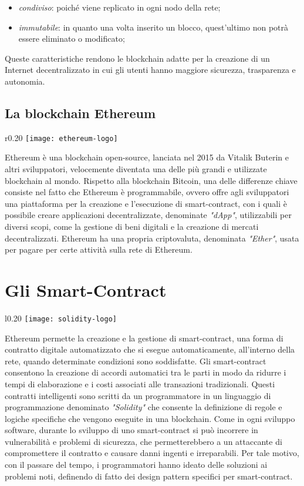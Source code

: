 \begin{itemize}
	\item \textit{condiviso}: poiché viene replicato in ogni nodo della rete;
	\item \textit{immutabile}: in quanto una volta inserito un blocco, quest'ultimo non potrà essere eliminato o modificato;
\end{itemize}
Queste caratteristiche rendono le blockchain adatte per la creazione di un Internet decentralizzato in cui gli utenti hanno maggiore sicurezza, trasparenza e autonomia.

\subsection{La blockchain Ethereum}

\begin{wrapfigure}{r}{0.20\textwidth}
	\centering
	\texttt{[image: ethereum-logo]}
\end{wrapfigure}

Ethereum\cite{ethereum} è una blockchain open-source, lanciata nel 2015 da Vitalik Buterin e altri sviluppatori, velocemente diventata una delle più grandi e utilizzate blockchain al mondo. Rispetto alla blockchain Bitcoin, una delle differenze chiave consiste nel fatto che Ethereum è programmabile, ovvero offre agli sviluppatori una piattaforma per la creazione e l'esecuzione di smart-contract, con i quali è possibile creare applicazioni decentralizzate, denominate \textit{"dApp"}, utilizzabili per diversi scopi, come la gestione di beni digitali e la creazione di mercati decentralizzati. Ethereum ha una propria criptovaluta, denominata \textit{"Ether"}, usata per pagare per certe attività sulla rete di Ethereum.

\section{Gli Smart-Contract}

\begin{wrapfigure}{l}{0.20\textwidth}
	\centering
	\texttt{[image: solidity-logo]}
\end{wrapfigure}

Ethereum permette la creazione e la gestione di smart-contract, una forma di contratto digitale automatizzato che si esegue automaticamente, all'interno della rete, quando determinate condizioni sono soddisfatte. Gli smart-contract consentono la creazione di accordi automatici tra le parti in modo da ridurre i tempi di elaborazione e i costi associati alle transazioni tradizionali. Questi contratti intelligenti sono scritti da un programmatore in un linguaggio di programmazione denominato \textit{"Solidity"}\cite{solidity} che consente la definizione di regole e logiche specifiche che vengono eseguite in una blockchain. Come in ogni sviluppo software, durante lo sviluppo di uno smart-contract si può incorrere in vulnerabilità e problemi di sicurezza, che permetterebbero a un attaccante di compromettere il contratto e causare danni ingenti e irreparabili. Per tale motivo, con il passare del tempo, i programmatori hanno ideato delle soluzioni ai problemi noti, definendo di fatto dei design pattern specifici per smart-contract.

